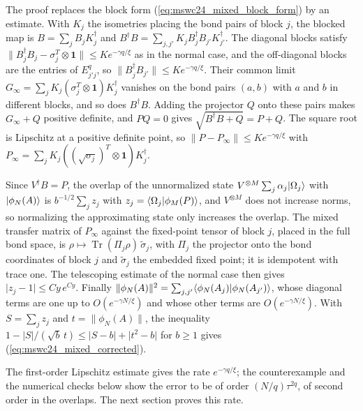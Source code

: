\documentclass{article}
\begin{document}
The proof replaces the block form (\ref{eq:mswc24_mixed_block_form}) by an estimate.
With $K_j$ the isometries placing the bond pairs of block $j$, the blocked map is
$B=\sum_jB_jK_j^\dagger$ and
$B^\dagger B=\sum_{j,j'}K_jB_j^\dagger B_{j'}K_{j'}^\dagger$. The diagonal blocks satisfy
$\lVert B_j^\dagger B_j-\sigma_j^T\otimes\mathbf 1\rVert\leq Ke^{-\gamma q/\xi}$ as in the
normal case, and the off-diagonal blocks are the entries of $E_{j'j}^q$, so
$\lVert B_j^\dagger B_{j'}\rVert\leq Ke^{-\gamma q/\xi}$. Their common limit
$G_\infty=\sum_jK_j(\sigma_j^T\otimes\mathbf 1)K_j^\dagger$ vanishes on the bond pairs
$(a,b)$ with $a$ and $b$ in different blocks, and so does $B^\dagger B$. Adding the
projector $Q$ onto these pairs makes $G_\infty+Q$ positive definite, and $PQ=0$ gives
$\sqrt{B^\dagger B+Q}=P+Q$. The square root is Lipschitz at a positive definite point,
so $\lVert P-P_\infty\rVert\leq Ke^{-\gamma q/\xi}$ with
$P_\infty=\sum_jK_j((\sqrt{\sigma_j})^T\otimes\mathbf 1)K_j^\dagger$.

Since $V^\dagger B=P$, the overlap of the unnormalized state
$V^{\otimes M}\sum_j\alpha_j|\Omega_j\rangle$ with $|\phi_N(A)\rangle$ is
$b^{-1/2}\sum_jz_j$ with $z_j=\langle \Omega_j | \phi_M(P) \rangle$, and $V^{\otimes M}$ does not
increase norms, so normalizing the approximating state only increases the overlap.
The mixed transfer matrix of $P_\infty$ against the fixed-point tensor of block $j$,
placed in the full bond space, is $\rho\mapsto\operatorname{Tr}(\Pi_j\rho)\,\tilde\sigma_j$,
with $\Pi_j$ the projector onto the bond coordinates of block $j$ and
$\tilde\sigma_j$ the embedded fixed point; it is idempotent with trace one. The
telescoping estimate of the normal case then gives
$\lvert z_j-1\rvert\leq Cy\,e^{Cy}$. Finally
$\lVert\phi_N(A)\rVert^2=\sum_{j,j'}\langle \phi_N(A_j) | \phi_N(A_{j'}) \rangle$, whose diagonal
terms are one up to $O(e^{-\gamma N/\xi})$ and whose other terms are
$O(e^{-\gamma N/\xi})$. With $S=\sum_jz_j$ and $t=\lVert\phi_N(A)\rVert$, the
inequality $1-\lvert S\rvert/(\sqrt b\,t)\leq\lvert S-b\rvert+\lvert t^2-b\rvert$ for
$b\geq1$ gives (\ref{eq:mswc24_mixed_corrected}).

The first-order Lipschitz estimate gives the rate $e^{-\gamma q/\xi}$; the
counterexample and the numerical checks below show the error to be of order
$(N/q)\tau^{2q}$, of second order in the overlaps. The next section proves this rate.
\end{document}
